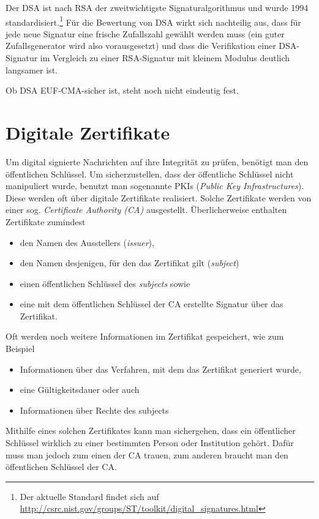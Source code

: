 Der DSA ist nach RSA der zweitwichtigste Signaturalgorithmus und wurde 1994 standardisiert.\footnote{Der aktuelle Standard findet sich auf \url{http://csrc.nist.gov/groups/ST/toolkit/digital_signatures.html}} Für die Bewertung von DSA wirkt sich nachteilig aus, dass für jede neue Signatur eine frische Zufallszahl gewählt werden muss (ein guter Zufallsgenerator wird also
vorausgesetzt) und dass die Verifikation einer DSA-Signatur im Vergleich zu einer RSA-Signatur mit kleinem Modulus deutlich langsamer ist.

Ob DSA EUF-CMA-sicher ist, steht noch nicht eindeutig fest.

\section{Digitale Zertifikate}
Um digital signierte Nachrichten auf ihre Integrität zu prüfen, benötigt
man den öffentlichen Schlüssel. Um sicherzustellen, dass der öffentliche
Schlüssel nicht manipuliert wurde, benutzt man sogenannte PKIs
(\emph{Public Key Infrastructures}). Diese werden oft über digitale
Zertifikate realisiert. Solche Zertifikate werden von einer
sog. \emph{Certificate Authority (CA)} ausgestellt. Überlicherweise
enthalten Zertifikate zumindest
\begin{itemize}
\item den Namen des Ausstellers (\emph{issuer}),
\item den Namen desjenigen, für den das Zertifikat gilt (\emph{subject})
\item einen öffentlichen Schlüssel des \emph{subjects} sowie
\item eine mit dem öffentlichen Schlüssel der CA erstellte Signatur über
  das Zertifikat.
\end{itemize}
Oft werden noch weitere Informationen im Zertifikat gespeichert, wie zum
Beispiel
\begin{itemize}
\item Informationen über das Verfahren, mit dem das Zertifikat generiert wurde,
\item eine Gültigkeitsdauer oder auch
\item Informationen über Rechte des subjects
\end{itemize}

Mithilfe eines solchen Zertifikates kann man sichergehen, dass ein
öffentlicher Schlüssel wirklich zu einer bestimmten Person oder
Institution gehört. Dafür muss man jedoch zum einen der CA trauen, zum
anderen braucht man den öffentlichen Schlüssel der CA. 

